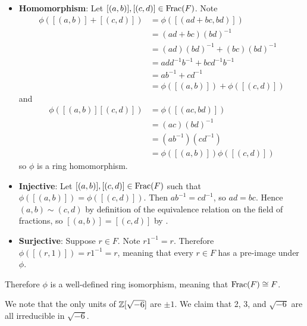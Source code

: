 \begin{questions}
\begin{itemize}
        \item \textbf{Homomorphism}: Let $[(a,b)], [(c,d)] \in \mathrm{Frac}(F)$. Note
        \begin{align*}
            \phi([(a,b)] + [(c,d)]) &= \phi([(ad+bc, bd)])\\
            &= (ad+bc)(bd)^{-1}\\
            &= (ad)(bd)^{-1} + (bc)(bd)^{-1}\\
            &= add^{-1}b^{-1} + bcd^{-1}b^{-1}\\
            &= ab^{-1} + cd^{-1}\\
            &= \phi([(a,b)]) + \phi([(c,d)])
        \end{align*}
        and
        \begin{align*}
            \phi([(a,b)][(c,d)]) &= \phi([(ac,bd)])\\
            &= (ac)(bd)^{-1}\\
            &= (ab^{-1})(cd^{-1})\\
            &= \phi([(a,b)])\phi([(c,d)])
        \end{align*}
        so $\phi$ is a ring homomorphism.
        
        \item \textbf{Injective}: Let $[(a,b)], [(c,d)] \in \mathrm{Frac}(F)$ such that $\phi([(a,b)]) = \phi([(c,d)])$. Then $ab^{-1} = cd^{-1}$, so $ad = bc$. Hence $(a,b) \mathrel{\sim} (c,d)$ by definition of the equivalence relation on the field of fractions, so $[(a,b)] = [(c,d)]$ by .
        
        \item \textbf{Surjective}: Suppose $r \in F$. Note $r1^{-1} = r$. Therefore $\phi([(r, 1)]) = r1^{-1} = r$, meaning that every $r \in F$ has a pre-image under $\phi$.
    \end{itemize}
    Therefore $\phi$ is a well-defined ring isomorphism, meaning that $\mathrm{Frac}(F) \cong F$.

    \item We note that the only units of $\mathbb{Z}[\sqrt{-6}]$ are $\pm1$. We claim that 2, 3, and $\sqrt{-6}$ are all irreducible in $\sqrt{-6}$.
    

\end{questions}
